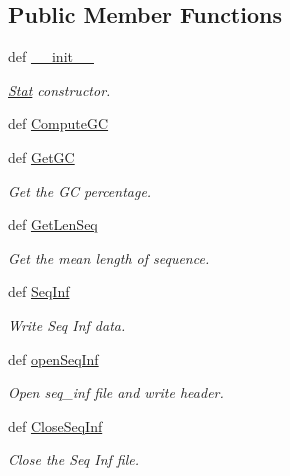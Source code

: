 \subsection*{\-Public \-Member \-Functions}
\begin{DoxyCompactItemize}
\item 
def \hyperlink{classirna_1_1iRNA__pred_1_1Stat_1_1Stat_a254861ef1e86e7645095b0177684a13f}{\-\_\-\-\_\-init\-\_\-\-\_\-}
\begin{DoxyCompactList}\small\item\em \hyperlink{classirna_1_1iRNA__pred_1_1Stat_1_1Stat}{\-Stat} constructor. \end{DoxyCompactList}\item 
def \hyperlink{classirna_1_1iRNA__pred_1_1Stat_1_1Stat_acf46c4edc783264ea1265695f14e187f}{\-Compute\-G\-C}
\item 
def \hyperlink{classirna_1_1iRNA__pred_1_1Stat_1_1Stat_a300a6d5dab37c69809ae1526ab30d592}{\-Get\-G\-C}
\begin{DoxyCompactList}\small\item\em \-Get the \-G\-C percentage. \end{DoxyCompactList}\item 
def \hyperlink{classirna_1_1iRNA__pred_1_1Stat_1_1Stat_a58995131e8e69b16ab25ae6611bc8ac2}{\-Get\-Len\-Seq}
\begin{DoxyCompactList}\small\item\em \-Get the mean length of sequence. \end{DoxyCompactList}\item 
def \hyperlink{classirna_1_1iRNA__pred_1_1Stat_1_1Stat_af3fdee78b1b09d7e505d45518647ba81}{\-Seq\-Inf}
\begin{DoxyCompactList}\small\item\em \-Write \-Seq \-Inf data. \end{DoxyCompactList}\item 
def \hyperlink{classirna_1_1iRNA__pred_1_1Stat_1_1Stat_a546de0c5b4ffcb50bbe50cb546d34290}{open\-Seq\-Inf}
\begin{DoxyCompactList}\small\item\em \-Open seq\-\_\-inf file and write header. \end{DoxyCompactList}\item 
def \hyperlink{classirna_1_1iRNA__pred_1_1Stat_1_1Stat_a9ce6d17b2b9146d5d2ac0fd3007d85a6}{\-Close\-Seq\-Inf}
\begin{DoxyCompactList}\small\item\em \-Close the \-Seq \-Inf file. \end{DoxyCompactList}\end{DoxyCompactItemize}
